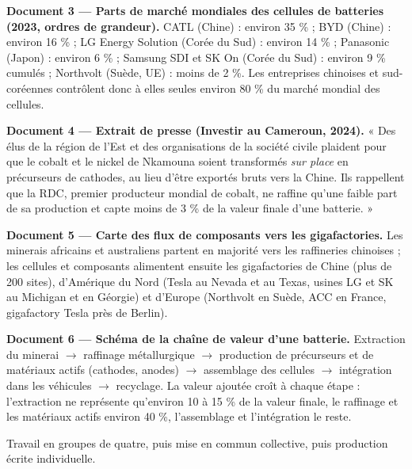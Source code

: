 \documentclass[11pt]{article}
\newcounter{popsec}
\newcounter{popsub}
\newcommand{\courssub}[1]{%
  \stepcounter{popsub}%
  \par\vspace{9pt}\noindent{\popxbold\fontsize{11.5}{13}\selectfont\color{popink}{\color{poporange}\thepopsec.\thepopsub}\hspace{6pt}#1}\par\nopagebreak\vspace{4pt}
}
\begin{document}
\textbf{Document 3 — Parts de marché mondiales des cellules de batteries (2023, ordres de grandeur).} CATL (Chine) : environ 35 \% ; BYD (Chine) : environ 16 \% ; LG Energy Solution (Corée du Sud) : environ 14 \% ; Panasonic (Japon) : environ 6 \% ; Samsung SDI et SK On (Corée du Sud) : environ 9 \% cumulés ; Northvolt (Suède, UE) : moins de 2 \%. Les entreprises chinoises et sud-coréennes contrôlent donc à elles seules environ 80 \% du marché mondial des cellules.

\textbf{Document 4 — Extrait de presse (Investir au Cameroun, 2024).} « Des élus de la région de l'Est et des organisations de la société civile plaident pour que le cobalt et le nickel de Nkamouna soient transformés \emph{sur place} en précurseurs de cathodes, au lieu d'être exportés bruts vers la Chine. Ils rappellent que la RDC, premier producteur mondial de cobalt, ne raffine qu'une faible part de sa production et capte moins de 3 \% de la valeur finale d'une batterie. »

\textbf{Document 5 — Carte des flux de composants vers les gigafactories.} Les minerais africains et australiens partent en majorité vers les raffineries chinoises ; les cellules et composants alimentent ensuite les gigafactories de Chine (plus de 200 sites), d'Amérique du Nord (Tesla au Nevada et au Texas, usines LG et SK au Michigan et en Géorgie) et d'Europe (Northvolt en Suède, ACC en France, gigafactory Tesla près de Berlin).

\textbf{Document 6 — Schéma de la chaîne de valeur d'une batterie.} Extraction du minerai $\rightarrow$ raffinage métallurgique $\rightarrow$ production de précurseurs et de matériaux actifs (cathodes, anodes) $\rightarrow$ assemblage des cellules $\rightarrow$ intégration dans les véhicules $\rightarrow$ recyclage. La valeur ajoutée croît à chaque étape : l'extraction ne représente qu'environ 10 à 15 \% de la valeur finale, le raffinage et les matériaux actifs environ 40 \%, l'assemblage et l'intégration le reste.

\courssub{Consignes}

Travail en groupes de quatre, puis mise en commun collective, puis production écrite individuelle.
\end{document}
